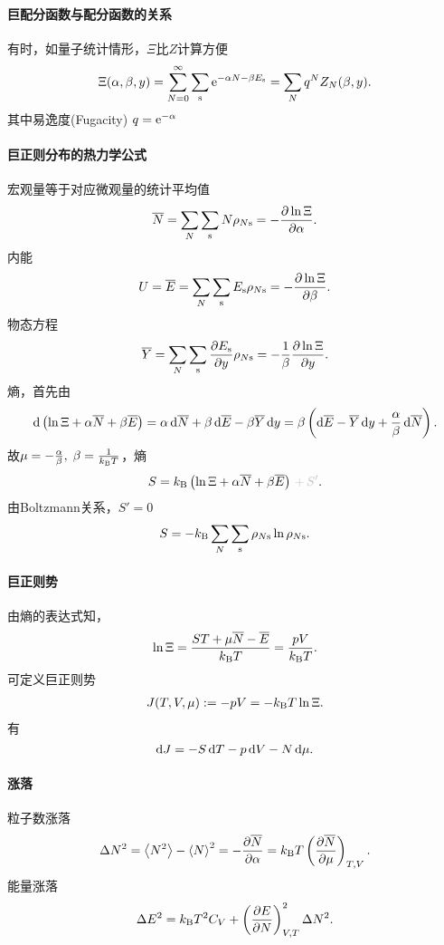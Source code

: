 \paragraph*{巨配分函数与配分函数的关系}有时，如量子统计情形，$\Xi$比$Z$计算方便
\[
	\Xi(\alpha,\beta,y)=\sum_{N=0}^\infty\sum_\mathrm s\mathop{}\!\mathrm{e}^{-\alpha N-\beta E_\mathrm s}=\sum_Nq^NZ_N(\beta,y).
\]
其中易逸度(Fugacity) $q=\mathop{}\!\mathrm{e}^{-\alpha}$

\paragraph*{巨正则分布的热力学公式}宏观量等于对应微观量的统计平均值
\begin{align}
	\overline N=\sum_N\sum_\mathrm s N\rho_{N\mathrm s}=-\frac{\partial^{\;\!\!}\ln\Xi}{\partial \alpha^{\;\!\!}}.
\end{align}
内能
\begin{align}
	U=\overline E=\sum_N\sum_\mathrm s E_\mathrm s\rho_{N\mathrm s}=-\frac{\partial^{\;\!\!}\ln\Xi}{\partial \beta^{\;\!\!}}.
\end{align}
物态方程
\begin{align}
	\avg Y=\sum_N\sum_\st\pv{E_\st}y\rho_{N\st}=-\frac1\beta\pv{\ln\Xi}y.
\end{align}
熵，首先由
\begin{align*}
	\mathop{}\!\mathrm{d}\left(\ln\Xi+\alpha\overline N+\beta\overline E\right)=\alpha\mathop{}\!\mathrm{d}\overline N+\beta\mathop{}\!\mathrm{d}\overline E-\beta\overline Y\mathop{}\!\mathrm{d} y=\beta\left(\mathop{}\!\mathrm{d}\overline E-\overline Y\mathop{}\!\mathrm{d} y+\frac\alpha\beta\mathop{}\!\mathrm{d}\overline N\right).
\end{align*}
故$\mu=-\frac\alpha\beta,\;\beta=\frac1{k_{\mathrm B} T}$，熵
\begin{align}
	S=\kB\kh{\ln\Xi+\alpha\avg N+\beta\avg E}{\color{lightgray}\,+\,S'}.
\end{align}
由Boltzmann关系，$S'=0$
\begin{align}
	S=-k_{\mathrm B}\sum_N\sum_\mathrm s\rho_{N\mathrm s}\ln\rho_{N\mathrm s}.
\end{align}
\paragraph*{巨正则势}
由熵的表达式知，
\[
	\ln\Xi=\frac{ST+\mu\overline N-\overline E}{k_{\mathrm B} T}=\frac{pV}{k_{\mathrm B} T}.
\]
可定义巨正则势
\begin{align}
	J(T,V,\mu):=-pV=-k_{\mathrm B} T\ln\Xi.
\end{align}
有
\[
	\mathop{}\!\mathrm{d} J=-S\mathop{}\!\mathrm{d} T-p\mathop{}\!\mathrm{d} V-N\mathop{}\!\mathrm{d}\mu.
\]
\paragraph*{涨落}
粒子数涨落
\begin{align}
	\D N^2=\ave{N^2}-\ave N^2=-\pv{\avg N}\alpha=\kB T\kh{\pv{\avg N}\mu}_{T,V}.
\end{align}
能量涨落
\begin{align}
	\Delta E^2=k_{\mathrm B} T^2C_V+\left(\frac{\partial^{\;\!\!}E}{\partial N^{\;\!\!}}\right)_{V,T}^2\Delta N^2.
\end{align}
